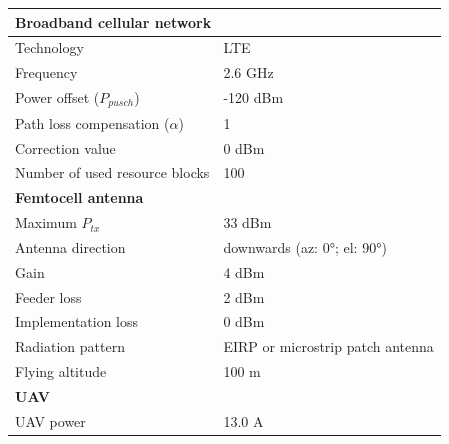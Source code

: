 \begin{table}[!htb]
\centering
\begin{tabular}[t]{ll}
        \toprule
        \multicolumn{2}{l}{\textbf{Broadband cellular network}} \\
        \hline
        \hspace{3mm}  Technology                          & LTE     \\
        \hspace{3mm}  Frequency                           & 2.6 GHz \\
        \hspace{3mm}  Power offset ($P_{pusch}$)            & -120 dBm  \\
        \hspace{3mm}  Path loss compensation ($\alpha$)   & 1  \\
        \hspace{3mm}  Correction value                    & 0 dBm  \\
        \hspace{3mm}  Number of used resource blocks      & 100  \\
        \hline
        \multicolumn{2}{l}{\textbf{Femtocell antenna}} \\
        \hline  
        \hspace{3mm}  Maximum $P_{tx}$                    & 33 dBm   \\
        \hspace{3mm}  Antenna  direction                  & downwards (az: \ang{0}; el: \ang{90})    \\ 
        \hspace{3mm}  Gain                                & 4 dBm   \\ 
        \hspace{3mm}  Feeder loss                         & 2 dBm   \\ 
        \hspace{3mm}  Implementation loss                 & 0 dBm   \\
        \hspace{3mm}  Radiation pattern                   & \acs{EIRP} or microstrip patch antenna\\
        \hspace{3mm}  Flying altitude                     & 100 m  \\
        \hline
        \multicolumn{2}{l}{\textbf{UAV}} \\
        \hline  
        \hspace{3mm}  UAV power                           & 13.0 A   \\

\end{tabular}
\end{table}
